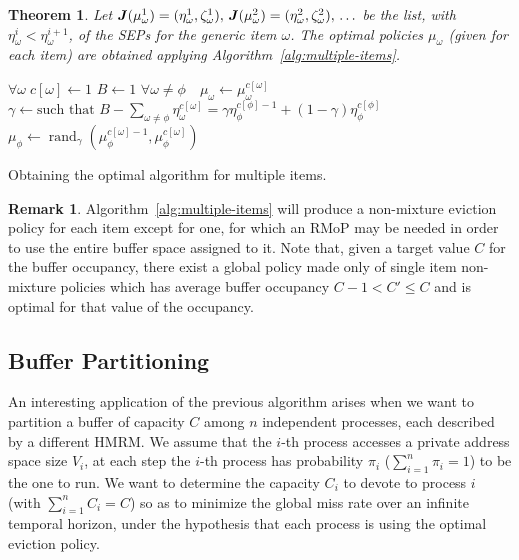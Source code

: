 \documentclass[11pt,a4paper]{article}
\DeclareMathOperator{\rand}{rand}
\newtheorem{theorem}{Theorem}
\theoremstyle{definition}
\newtheorem{remark}{Remark}
\theoremstyle{remark}
\def\vec#1{\mathchoice{\mbox{\boldmath$\displaystyle#1$}}
  {\mbox{\boldmath$\textstyle#1$}}
  {\mbox{\boldmath$\scriptstyle#1$}}
  {\mbox{\boldmath$\scriptscriptstyle#1$}}}
\begin{document}
\begin{theorem}
  Let $\vec J(\mu^1_\omega)=(\eta^1_\omega,\zeta^1_\omega), \, \vec
  J(\mu^2_\omega)=(\eta^2_\omega,\zeta^2_\omega), \, \ldots$ be the list, with
  $\eta^i_\omega < \eta^{i+1}_\omega$, of the SEPs for the generic item
  $\omega$. The optimal policies $\mu_\omega$ (given for each item) are obtained
  applying Algorithm~\ref{alg:multiple-items}.
\end{theorem}
{\centering
  \begin{algorithm}
    $\forall \omega \; c[\omega] \leftarrow 1$ \;
    $ B \leftarrow 1 $ \;
    $\forall \omega\not = \phi \quad \mu_\omega \leftarrow
    \mu_\omega^{c[\omega]} $ \;
    $ \gamma \leftarrow \text{such that } B-\sum_{\omega \not = \phi} \eta_\omega^{c[\omega]} = \gamma
    \eta_\phi^{c[\phi]-1}+(1-\gamma) \eta_\phi^{c[\phi]}$ \;
    $\mu_\phi \leftarrow \rand_\gamma\left(\mu_\phi^{c[\omega]-1},\mu_\phi^{c[\omega]} \right)$ \;
    \caption{Obtaining the optimal algorithm for multiple items.}
    \label{alg:multiple-items}
  \end{algorithm}
}
\begin{remark}
  Algorithm~\ref{alg:multiple-items} will produce a non-mixture
  eviction policy for each item except for one, for which an RMoP may
  be needed in order to use the entire buffer space assigned to
  it. Note that, given a target value $C$ for the buffer occupancy,
  there exist a global policy made only of single item non-mixture
  policies which has average buffer occupancy $C-1 < C' \leq C$ and is
  optimal for that value of the occupancy.
\end{remark}

\subsection{Buffer Partitioning}
\label{bp}
An interesting application of the previous algorithm arises when we want to
partition a buffer of capacity $C$ among $n$ independent processes, each
described by a different HMRM. We assume that the $i$-th process accesses a
private address space size $V_i$, at each step the $i$-th process has
probability $\pi_i$ ($\sum_{i=1}^n \pi_i=1$) to be the one to run.  We want to
determine the capacity $C_i$ to devote to process $i$ (with $\sum_{i=1}^n
C_i=C$) so as to minimize the global miss rate over an infinite temporal
horizon, under the hypothesis that each process is using the optimal eviction
policy.
\end{document}
